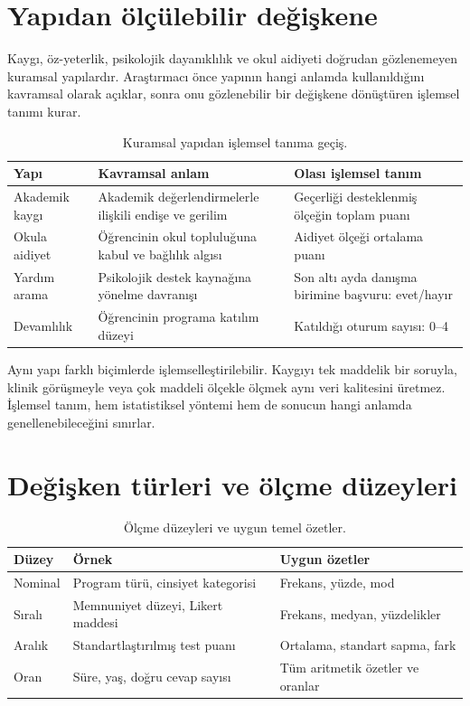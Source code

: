 \section{Yapıdan ölçülebilir değişkene}

Kaygı, öz-yeterlik, psikolojik dayanıklılık ve okul aidiyeti doğrudan
gözlenemeyen kuramsal yapılardır. Araştırmacı önce yapının hangi anlamda
kullanıldığını kavramsal olarak açıklar, sonra onu gözlenebilir bir değişkene
dönüştüren işlemsel tanımı kurar.

\begin{table}[htbp]
\centering
\caption{Kuramsal yapıdan işlemsel tanıma geçiş.}
\begin{tabular}{@{}p{}p{}p{}@{}}
\toprule
Yapı & Kavramsal anlam & Olası işlemsel tanım \\
\midrule
Akademik kaygı & Akademik değerlendirmelerle ilişkili endişe ve gerilim & Geçerliği desteklenmiş ölçeğin toplam puanı \\
Okula aidiyet & Öğrencinin okul topluluğuna kabul ve bağlılık algısı & Aidiyet ölçeği ortalama puanı \\
Yardım arama & Psikolojik destek kaynağına yönelme davranışı & Son altı ayda danışma birimine başvuru: evet/hayır \\
Devamlılık & Öğrencinin programa katılım düzeyi & Katıldığı oturum sayısı: 0--4 \\
\bottomrule
\end{tabular}
\end{table}

Aynı yapı farklı biçimlerde işlemselleştirilebilir. Kaygıyı tek maddelik bir
soruyla, klinik görüşmeyle veya çok maddeli ölçekle ölçmek aynı veri kalitesini
üretmez. İşlemsel tanım, hem istatistiksel yöntemi hem de sonucun hangi anlamda
genellenebileceğini sınırlar.

\section{Değişken türleri ve ölçme düzeyleri}

\begin{table}[htbp]
\centering
\caption{Ölçme düzeyleri ve uygun temel özetler.}
\begin{tabular}{p{}p{}p{}}
\toprule
Düzey & Örnek & Uygun özetler \\
\midrule
Nominal & Program türü, cinsiyet kategorisi & Frekans, yüzde, mod \\
Sıralı & Memnuniyet düzeyi, Likert maddesi & Frekans, medyan, yüzdelikler \\
Aralık & Standartlaştırılmış test puanı & Ortalama, standart sapma, fark \\
Oran & Süre, yaş, doğru cevap sayısı & Tüm aritmetik özetler ve oranlar \\
\bottomrule
\end{tabular}
\end{table}

